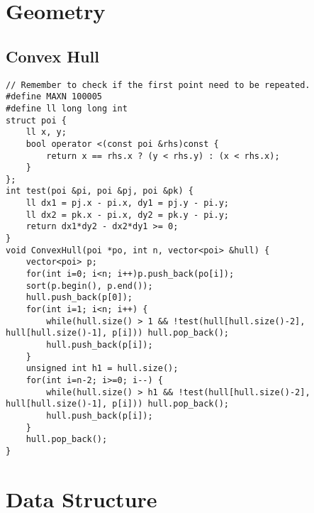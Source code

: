 \section{Geometry}
\subsection{Convex Hull}
\begin{lstlisting}
// Remember to check if the first point need to be repeated.
#define MAXN 100005
#define ll long long int
struct poi {
	ll x, y;
	bool operator <(const poi &rhs)const {
		return x == rhs.x ? (y < rhs.y) : (x < rhs.x);
	}
};
int test(poi &pi, poi &pj, poi &pk) {
	ll dx1 = pj.x - pi.x, dy1 = pj.y - pi.y;
	ll dx2 = pk.x - pi.x, dy2 = pk.y - pi.y;
	return dx1*dy2 - dx2*dy1 >= 0;
}
void ConvexHull(poi *po, int n, vector<poi> &hull) {
	vector<poi> p;
	for(int i=0; i<n; i++)p.push_back(po[i]);
	sort(p.begin(), p.end());
	hull.push_back(p[0]);
	for(int i=1; i<n; i++) {
		while(hull.size() > 1 && !test(hull[hull.size()-2], hull[hull.size()-1], p[i])) hull.pop_back();
		hull.push_back(p[i]);
	}
	unsigned int h1 = hull.size();
	for(int i=n-2; i>=0; i--) {
		while(hull.size() > h1 && !test(hull[hull.size()-2], hull[hull.size()-1], p[i])) hull.pop_back();
		hull.push_back(p[i]);
	}
	hull.pop_back();
}
\end{lstlisting}
\section{Data Structure}
